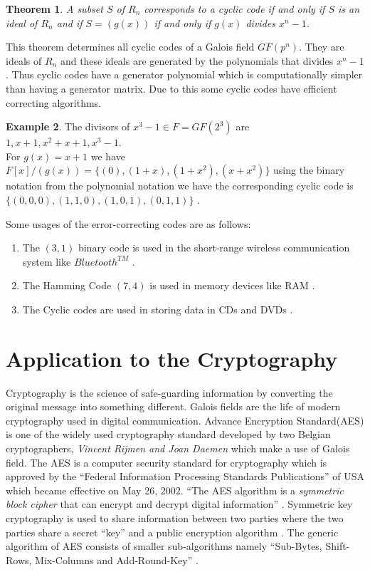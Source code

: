 \documentclass[a4paper,twoside,10pt]{article}
\theoremstyle{plain}
\newtheorem{theorem}{Theorem}[section]
\theoremstyle{definition}
\newtheorem{example}[theorem]{Example}
\begin{document}
\begin{theorem} \cite{error_correct}
A subset \(S\) of \(R_n\) corresponds to a cyclic code if and only if \(S\) is an ideal of \(R_n\) and if \(S=(g(x))\) if and only if  \(g(x)\) divides \(x^n-1\).
\end{theorem}

\noindent
This theorem determines all cyclic codes of a Galois field \(GF(p^n)\). They are ideals of \(R_n\) and these ideals are generated by the polynomials that divides \(x^n-1\). Thus cyclic codes have a generator polynomial which is computationally simpler than having a generator matrix. Due to this some cyclic codes have efficient correcting algorithms.

\begin{example}
  The divisors of \(x^3-1 \in F=GF(2^{3})\) are \(1, x+1, x^2+x+1, x^3-1\).\\
  For \(g(x)=x+1\) we have \(F[x]/(g(x))=\{(0),(1+x),(1+x^2),(x+x^2)\}\) using the binary notation from the polynomial notation we have the corresponding cyclic code is \(\{(0,0,0),(1,1,0),(1,0,1),(0,1,1)\}\) \cite{error_correct}.
\end{example}
Some usages of the error-correcting codes are as follows:
\begin{enumerate}
\item The \((3,1)\) binary code is used in the short-range wireless communication system like \(Bluetooth^{TM}\) \cite{wireless}.
\item The Hamming Code \((7,4)\) is used in memory devices like RAM \cite{coding}.

\item The Cyclic codes are used in storing data in CDs and DVDs \cite{coding}.
\end{enumerate}


\section{Application to the Cryptography}
\noindent
Cryptography is the science of safe-guarding information by converting the original message into something different. Galois fields are the life of modern cryptography used in digital communication. Advance Encryption Standard(AES) is one of the widely used cryptography standard developed by two Belgian cryptographers,  \textit{Vincent Rijmen and Joan Daemen} \cite{aes} which make a use of Galois field. The AES is a computer security standard for cryptography which is approved by the ``Federal Information Processing Standards Publications'' of USA which became effective on May 26, 2002. ``The AES algorithm is a \textit{symmetric block cipher} that can encrypt and decrypt digital information'' \cite{aes}. Symmetric key cryptography is used to share information between two parties where the two parties share a secret ``key'' and a public encryption algorithm \cite{wireless}. The generic algorithm of AES consists of smaller sub-algorithms namely ``Sub-Bytes, Shift-Rows, Mix-Columns and Add-Round-Key'' \cite{aes}.\\[2mm]
\end{document}
